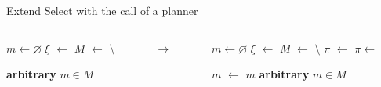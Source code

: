 \begin{frame}[fragile]{Extend Select with the call of a planner}
    \begin{columns}[c]
        \begin{column}{0.4\textwidth}
            \begin{algorithm}[H]
                \begin{algorithmic}
                    \scriptsize
                    \State $m \gets \varnothing$
                    \State $\xi$ $\gets$ 
                    \State $M$ $\gets$  $\setminus$ 
                    
                    \State \Return \textbf{arbitrary} $m \in M$ \label{line:return-failure}
                    
                    \EndFunction
              
                \end{algorithmic}
                \caption{Greedy select for a task $\tau$.}
                \label{alg:plan}
              \end{algorithm}
        \end{column}
        \pause
        \begin{column}[c]{0.1\textwidth}
            \centering
            $\rightarrow$
        \end{column}
        
        \begin{column}{0.55\textwidth}
            
            \begin{algorithm}[H]
                \begin{algorithmic}
                    \scriptsize
                    \State $m \gets \varnothing$
                    \State $\xi$ $\gets$ 
                    \State $M$ $\gets$  $\setminus$ 
                    \State $\pi$ $\gets$  \label{line:get-parent-plan}
                     \label{line:check-valid}
                      \State $\pi \gets$  \label{line:call-planner}
                      
                    \EndIf
                    \State $m$ $\gets$  \label{line:get-method}
                      \State \Return $m$ \label{line:return-success}
                    \Else
                      \State \Return \textbf{arbitrary} $m \in M$ \label{line:return-failure}
                    \EndIf
                    \EndFunction
              

\end{algorithmic}
\end{algorithm}
\end{column}
\end{columns}
\end{frame}
